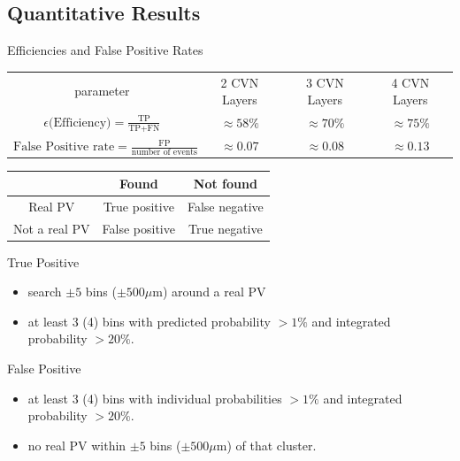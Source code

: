 \subsection{Quantitative Results }
\begin{frame}{Efficiencies and False Positive Rates}
\begin{table}[]
\centering
\begin{tabular}{cccc}
parameter & 2 CVN Layers &
3 CVN Layers & 4 CVN Layers \\ [0.3em]

$\epsilon \textrm{(Efficiency)}
 = \frac{\mbox{TP}}{\mbox{TP} + \mbox{FN}} $
&  $ \approx 58\% $  & $ \approx 70\% $ & $ \approx 75\% $ \\ [0.3em]
$ \textrm{False Positive rate}
 = \frac{\mbox{FP}}{\mbox{number of events}} $
 &  $\approx 0.07 $ & $\approx 0.08 $  & $ \approx 0.13 $ \\
 \end{tabular}
\end{table}
 \vskip -0.05in
  \begin{table}[]
      \centering
      \begin{tabular}{c|cc}
         & Found & Not found \\ \midrule
         Real PV & True positive & False negative\\
         Not a real PV & False positive & True negative
      \end{tabular}
  \end{table}
  \vskip -0.15in
  \begin{block}{True Positive}
    \begin{itemize}
    	\item search $ \pm 5 $ bins ($ \pm 500 \mu $m) around a real PV
    	\item at least 3 (4) bins with predicted probability
    	   $ > 1\% $ and 
    	   integrated probability $ > 20\%$.
    \end{itemize}

    \end{block}
    \begin{block}{False Positive}
    \begin{itemize}
        \item
           at least 3 (4) bins with individual probabilities $ > 1\% $ and
          integrated probability $ > 20\%$.
        \item 
        no real PV within $ \pm 5 $ bins ($ \pm 500 \mu $m) of that cluster.
    \end{itemize}
  \end{block}
\end{frame}



